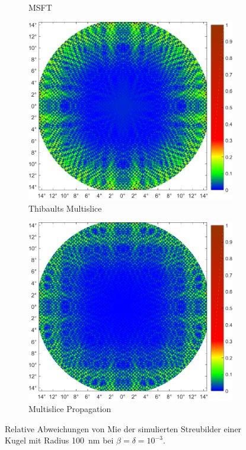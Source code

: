 \begin{figure}
\begin{subfigure}[b]{0.48\textwidth}
		\caption{MSFT}
	\end{subfigure}
	\par\bigskip
	\begin{subfigure}[b]{0.48\textwidth}
		\includegraphics[width=\textwidth]{images/fig_sim_relerror_thibault-r100-bd1e-3.pdf}
		\caption{Thibaults Multislice}
	\end{subfigure}\hfill
	\begin{subfigure}[b]{0.48\textwidth}
		\includegraphics[width=\textwidth]{images/fig_sim_relerror_multislice-r100-bd1e-3.pdf}
		\caption{Multislice Propagation}
	\end{subfigure}
	\caption[Relativer Fehler der Simulationen]{Relative Abweichungen von Mie der simulierten Streubilder einer Kugel mit Radius \SI{100}{nm} bei $\beta=\delta=10^{-3}$. }
	\label{fig:relerror}
\end{figure}

